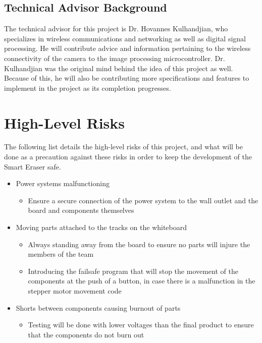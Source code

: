 \subsection{Technical Advisor Background} \par	
\setlength{\parindent}{2.5ex} The technical advisor for this project is Dr. Hovannes Kulhandjian, who specializes in wireless communications and networking as well as digital signal processing. He will contribute advice and information pertaining to the wireless connectivity of the camera to the image processing microcontroller. Dr. Kulhandjian was the original mind behind the idea of this project as well. Because of this, he will also be contributing more specifications and features to implement in the project as its completion progresses. \\ \par

\section{High-Level Risks}
The following list details the high-level risks of this project, and what will be done as a precaution against these risks in order to keep the development of the Smart Eraser safe.
\begin{itemize}
	\item Power systems malfunctioning
	\begin{itemize}
	\item Ensure a secure connection of the power system to the wall outlet and the board and components themselves
	\end{itemize}
	\item Moving parts attached to the tracks on the whiteboard
	\begin{itemize}
	\item Always standing away from the board to ensure no parts will injure the members of the team
	\item Introducing the failsafe program that will stop the movement of the components at the push of a button, in case there is a malfunction in the stepper motor movement code
	\end{itemize}
	\item Shorts between components causing burnout of parts
	\begin{itemize}
	\item Testing will be done with lower voltages than the final product to ensure that the components do not burn out
\end{itemize}
\end{itemize}

